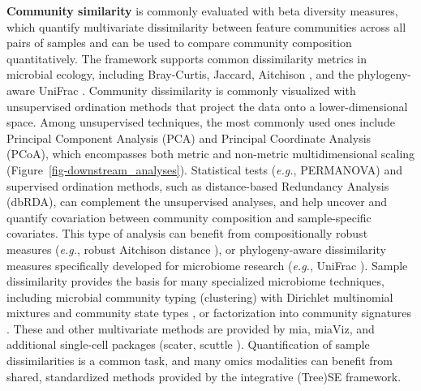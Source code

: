 \documentclass[
  sn-nature,
]{sn-jnl}
\begin{document}
\textbf{Community similarity} is commonly evaluated with beta diversity
measures, which quantify multivariate dissimilarity between feature
communities across all pairs of samples and can be used to compare
community composition quantitatively. The framework supports common
dissimilarity metrics in microbial ecology, including Bray-Curtis,
Jaccard, Aitchison \citep{bastiaanssen_bugs1_2023}, and the
phylogeny-aware UniFrac \citep{lozupone2005}. Community dissimilarity is
commonly visualized with unsupervised ordination methods that project
the data onto a lower-dimensional space. Among unsupervised techniques,
the most commonly used ones include Principal Component Analysis (PCA)
and Principal Coordinate Analysis (PCoA), which encompasses both metric
and non-metric multidimensional scaling
(Figure~\ref{fig-downstream_analyses}). Statistical tests (\emph{e.g.},
PERMANOVA) and supervised ordination methods, such as distance-based
Redundancy Analysis (dbRDA), can complement the unsupervised analyses,
and help uncover and quantify covariation between community composition
and sample-specific covariates. This type of analysis can benefit from
compositionally robust measures (\emph{e.g.}, robust Aitchison distance
\citep{martino2019}), or phylogeny-aware dissimilarity measures
specifically developed for microbiome research (\emph{e.g.}, UniFrac
\citep{lozupone2005}). Sample dissimilarity provides the basis for many
specialized microbiome techniques, including microbial community typing
(clustering) with Dirichlet multinomial mixtures \citep{holmes2012} and
community state types \citep{digiulio2015}, or factorization into
community signatures \citep{frioux2023}. These and other multivariate
methods are provided by mia, miaViz, and additional single-cell packages
(scater, scuttle \citep{amezquita2020}). Quantification of sample
dissimilarities is a common task, and many omics modalities can benefit
from shared, standardized methods provided by the integrative (Tree)SE
framework.
\end{document}
